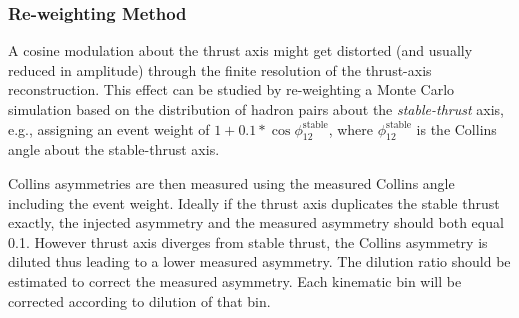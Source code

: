 \subsubsection{\texorpdfstring{Re-weighting Method}{Re-weighting Method}} 
\label{sec:pi0thrustcorrection}
 A cosine modulation about the thrust axis might get distorted (and usually reduced in amplitude) through the finite resolution of the thrust-axis reconstruction. This effect can be studied by re-weighting a Monte Carlo simulation based on the distribution of hadron pairs about the {\em stable-thrust} axis, e.g., assigning an event weight of $1+0.1*\cos\phi_{12}^{\text{stable}}$, where $\phi_{12}^\text{stable}$ is the Collins angle about the stable-thrust axis.

Collins asymmetries are then measured using the measured Collins angle including the event weight. Ideally if the thrust axis duplicates the stable thrust exactly, the injected asymmetry and the measured asymmetry should both equal 0.1. However thrust axis diverges from stable thrust, the Collins asymmetry is diluted thus leading to a lower measured asymmetry. The dilution ratio should be estimated to correct the measured asymmetry. Each kinematic bin will be corrected according to dilution of that bin.


